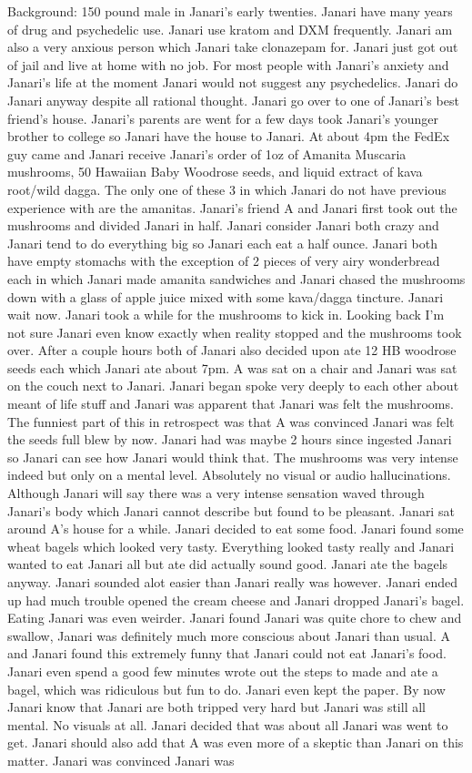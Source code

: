 \documentclass[12pt]{book}
\begin{document}
Background: 150 pound male in Janari's early twenties. Janari have many years of drug and psychedelic use. Janari use kratom and DXM frequently. Janari am also a very anxious person which Janari take clonazepam for. Janari just got out of jail and live at home with no job. For most people with Janari's anxiety and Janari's life at the moment Janari would not suggest any psychedelics. Janari do Janari anyway despite all rational thought. Janari go over to one of Janari's best friend's house. Janari's parents are went for a few days took Janari's younger brother to college so Janari have the house to Janari. At about 4pm the FedEx guy came and Janari receive Janari's order of 1oz of Amanita Muscaria mushrooms, 50 Hawaiian Baby Woodrose seeds, and liquid extract of kava root/wild dagga. The only one of these 3 in which Janari do not have previous experience with are the amanitas. Janari's friend A and Janari first took out the mushrooms and divided Janari in half. Janari consider Janari both crazy and Janari tend to do everything big so Janari each eat a half ounce. Janari both have empty stomachs with the exception of 2 pieces of very airy wonderbread each in which Janari made amanita sandwiches and Janari chased the mushrooms down with a glass of apple juice mixed with some kava/dagga tincture. Janari wait now. Janari took a while for the mushrooms to kick in. Looking back I'm not sure Janari even know exactly when reality stopped and the mushrooms took over. After a couple hours both of Janari also decided upon ate 12 HB woodrose seeds each which Janari ate about 7pm. A was sat on a chair and Janari was sat on the couch next to Janari. Janari began spoke very deeply to each other about meant of life stuff and Janari was apparent that Janari was felt the mushrooms. The funniest part of this in retrospect was that A was convinced Janari was felt the seeds full blew by now. Janari had was maybe 2 hours since ingested Janari so Janari can see how Janari would think that. The mushrooms was very intense indeed but only on a mental level. Absolutely no visual or audio hallucinations. Although Janari will say there was a very intense sensation waved through Janari's body which Janari cannot describe but found to be pleasant. Janari sat around A's house for a while. Janari decided to eat some food. Janari found some wheat bagels which looked very tasty. Everything looked tasty really and Janari wanted to eat Janari all but ate did actually sound good. Janari ate the bagels anyway. Janari sounded alot easier than Janari really was however. Janari ended up had much trouble opened the cream cheese and Janari dropped Janari's bagel. Eating Janari was even weirder. Janari found Janari was quite chore to chew and swallow, Janari was definitely much more conscious about Janari than usual. A and Janari found this extremely funny that Janari could not eat Janari's food. Janari even spend a good few minutes wrote out the steps to made and ate a bagel, which was ridiculous but fun to do. Janari even kept the paper. By now Janari know that Janari are both tripped very hard but Janari was still all mental. No visuals at all. Janari decided that was about all Janari was went to get. Janari should also add that A was even more of a skeptic than Janari on this matter. Janari was convinced Janari was 
\end{document}
